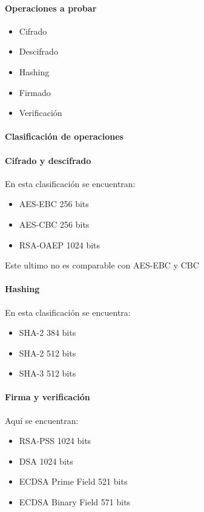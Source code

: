 \documentclass[../main.tex]{subfiles}
\begin{document}
\hypertarget{operaciones-a-probar}{%
  \paragraph{Operaciones a probar}\label{operaciones-a-probar}}

\begin{itemize}
        \tightlist{}
  \item Cifrado
  \item Descifrado
  \item Hashing
  \item Firmado
  \item Verificación
\end{itemize}

\hypertarget{clasificaciuxf2n-de-operaciones}{%
  \paragraph{Clasificación de
    operaciones}\label{clasificaciuxf2n-de-operaciones}}

\hypertarget{cifrado-y-decifrado}{%
  \paragraph{Cifrado y descifrado}\label{cifrado-y-decifrado}}

En esta clasificación se encuentran:

\begin{itemize}
        \tightlist{}
  \item AES-EBC 256 bits
  \item AES-CBC 256 bits
  \item RSA-OAEP 1024 bits
\end{itemize}

Este ultimo no es comparable con AES-EBC y CBC

\hypertarget{hashing}{%
  \paragraph{Hashing}\label{hashing}}

En esta clasificación se encuentra:

\begin{itemize}
        \tightlist{}
  \item SHA-2 384 bits
  \item SHA-2 512 bits
  \item SHA-3 512 bits
\end{itemize}

\hypertarget{firma-y-verificacion}{%
  \paragraph{Firma y verificación}\label{firma-y-verificacion}}

Aquí se encuentran:

\begin{itemize}
        \tightlist{}
  \item RSA-PSS 1024 bits
  \item DSA 1024 bits
  \item ECDSA Prime Field 521 bits
  \item ECDSA Binary Field 571 bits
\end{itemize}
\end{document}
